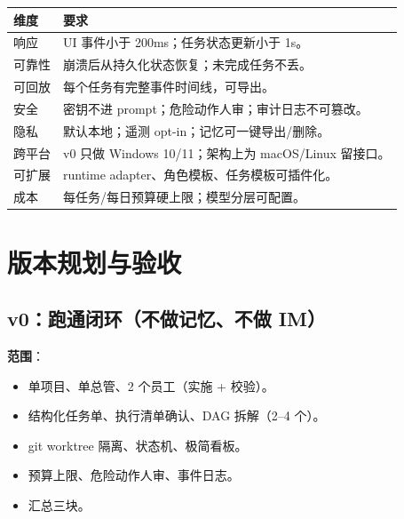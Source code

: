 \documentclass[UTF8,11pt,a4paper,fontset=windows]{ctexart}
\let\ocsection\section
\renewcommand{\section}{\Needspace{8\baselineskip}\ocsection}
\let\ocsubsection\subsection
\renewcommand{\subsection}{\Needspace{5\baselineskip}\ocsubsection}
\begin{document}
\noindent\begin{minipage}{\linewidth}
\centering
{}
\small
\begin{tabularx}{\linewidth}{@{}p{2.6cm} X@{}}
\toprule
\textbf{维度} & \textbf{要求} \\
\midrule
响应 & UI 事件小于 200ms；任务状态更新小于 1s。 \\
可靠性 & 崩溃后从持久化状态恢复；未完成任务不丢。 \\
可回放 & 每个任务有完整事件时间线，可导出。 \\
安全 & 密钥不进 prompt；危险动作人审；审计日志不可篡改。 \\
隐私 & 默认本地；遥测 opt-in；记忆可一键导出/删除。 \\
跨平台 & v0 只做 Windows 10/11；架构上为 macOS/Linux 留接口。 \\
可扩展 & runtime adapter、角色模板、任务模板可插件化。 \\
成本 & 每任务/每日预算硬上限；模型分层可配置。 \\
\bottomrule
\end{tabularx}
\end{minipage}

\section{版本规划与验收}
\label{sec:roadmap}

\subsection{v0：跑通闭环（不做记忆、不做 IM）}

\textbf{范围}：

\begin{itemize}
  \item 单项目、单总管、2 个员工（实施 + 校验）。
  \item 结构化任务单、执行清单确认、DAG 拆解（2--4 个）。
  \item git worktree 隔离、状态机、极简看板。
  \item 预算上限、危险动作人审、事件日志。
  \item 汇总三块。
\end{itemize}
\end{document}
